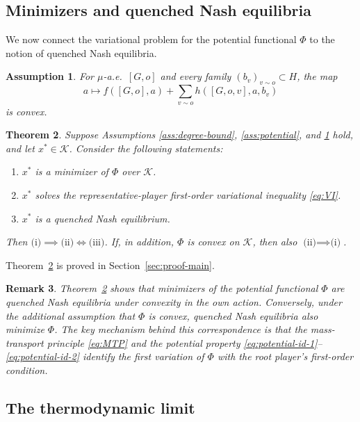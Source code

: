 \documentclass[11pt]{article}
\newtheorem{theorem}{Theorem}[section]
\newtheorem{remark}[theorem]{Remark}
\newtheorem{assumption}[theorem]{Assumption}
\numberwithin{equation}{section}
\begin{document}
\subsection{Minimizers and quenched Nash equilibria}

We now connect the variational problem for the potential functional \(\Phi\) to the notion of quenched Nash equilibria.

\begin{assumption}\label{ass:convex}
For \(\mu\)-a.e.~\([G,o]\) and every family \((b_v)_{v\sim o}\subset H\), the map
\[
a \mapsto f([G,o],a)+\sum_{v\sim o} h([G,o,v],a,b_v)
\]
is convex.
\end{assumption}

\begin{theorem}\label{thm:main}
Suppose Assumptions \ref{ass:degree-bound}, \ref{ass:potential}, and \ref{ass:convex} hold, and let \(x^\ast\in\mathcal K\). Consider the following statements:
\begin{enumerate}[label=(\roman*)]
\item \(x^\ast\) is a minimizer of \(\Phi\) over \(\mathcal K\).

\item \(x^\ast\) solves the representative-player first-order variational inequality \eqref{eq:VI}.

\item \(x^\ast\) is a quenched Nash equilibrium.
\end{enumerate}
Then \(\text{(i)}\implies\text{(ii)}\iff\text{(iii)}\). If, in addition, \(\Phi\) is convex on \(\mathcal K\), then also \(\text{(ii)}\implies\text{(i)}\).
\end{theorem}
Theorem~\ref{thm:main} is proved in Section~\ref{sec:proof-main}.
\begin{remark}
Theorem~\ref{thm:main} shows that minimizers of the potential functional \(\Phi\) are quenched Nash equilibria under convexity in the own action. Conversely, under the additional assumption that \(\Phi\) is convex, quenched Nash equilibria also minimize \(\Phi\). The key mechanism behind this correspondence is that the mass-transport principle \eqref{eq:MTP} and the potential property \eqref{eq:potential-id-1}--\eqref{eq:potential-id-2} identify the first variation of \(\Phi\) with the root player's first-order condition.
\end{remark}

\subsection{The thermodynamic limit}
\end{document}
